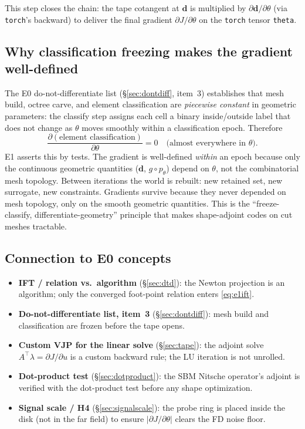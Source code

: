 \documentclass[11pt]{article}
\begin{document}
This step closes the chain: the tape cotangent at $\mathbf{d}$ is
multiplied by $\partial \mathbf{d}/\partial \theta$ (via \texttt{torch}'s
backward) to deliver the final gradient $\partial J/\partial \theta$ on the
\texttt{torch} tensor \texttt{theta}.

\subsection{Why classification freezing makes the gradient well-defined}
\label{sec:e1freeze}

The E0 do-not-differentiate list (\S\ref{sec:dontdiff}, item~3) establishes
that mesh build, octree carve, and element classification are
\emph{piecewise constant} in geometric parameters: the classify step assigns
each cell a binary inside/outside label that does not change as $\theta$
moves smoothly within a classification epoch.  Therefore
\[
  \frac{\partial (\text{element classification})}{\partial \theta} = 0
  \quad\text{(almost everywhere in } \theta\text{).}
\]
E1 asserts this by tests.  The gradient is well-defined \emph{within} an
epoch because only the continuous geometric quantities ($\mathbf{d}$,
$g \circ p_\theta$) depend on $\theta$, not the combinatorial mesh
topology.  Between iterations the world is rebuilt: new retained set, new
surrogate, new constraints.  Gradients survive because they never depended
on mesh topology, only on the smooth geometric quantities.  This is the
``freeze-classify, differentiate-geometry'' principle that makes
shape-adjoint codes on cut meshes tractable.

\subsection{Connection to E0 concepts}
\label{sec:e1e0connect}

\begin{itemize}
  \item \textbf{IFT / relation vs.\ algorithm} (\S\ref{sec:dtd}): the Newton
    projection is an algorithm; only the converged foot-point relation
    enters \eqref{eq:e1ift}.
  \item \textbf{Do-not-differentiate list, item~3} (\S\ref{sec:dontdiff}):
    mesh build and classification are frozen before the tape opens.
  \item \textbf{Custom VJP for the linear solve} (\S\ref{sec:tape}): the
    adjoint solve $A^\top \lambda = \partial J/\partial u$ is a custom
    backward rule; the LU iteration is not unrolled.
  \item \textbf{Dot-product test} (\S\ref{sec:dotproduct}): the SBM
    Nitsche operator's adjoint is verified with the dot-product test before
    any shape optimization.
  \item \textbf{Signal scale / H4} (\S\ref{sec:signalscale}): the probe
    ring is placed inside the disk (not in the far field) to ensure
    $|\partial J/\partial \theta|$ clears the FD noise floor.
\end{itemize}
\end{document}
